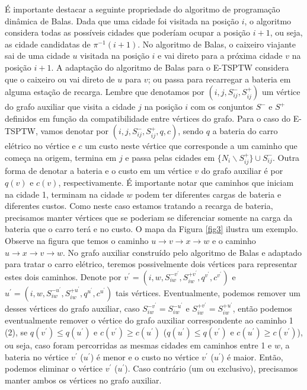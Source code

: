 \documentclass{article}
\begin{document}
É importante destacar a seguinte propriedade do algoritmo de programação dinâmica de Balas. Dada que uma cidade foi visitada na posição $i$, o algoritmo considera todas as possíveis cidades que poderíam ocupar a posição $i+1$, ou seja, as cidade candidatas de $\pi^{-1}(i+1)$. No algoritmo de Balas, o caixeiro viajante sai de uma cidade $u$ visitada na posição $i$ e vai direto para a próxima cidade $v$ na posição $i+1$. A adaptação do algoritmo de Balas para o E-TSPTW considera que o caixeiro ou vai direto de $u$ para $v$; ou passa para recarregar a bateria em alguma estação de recarga. Lembre que denotamos por $(i,j,S^-_{ij},S^+_{ij})$ um vértice do grafo auxiliar que visita a cidade $j$ na posição $i$ com os conjuntos $S^-$ e $S^+$ definidos em função da compatibilidade entre vértices do grafo. Para o caso do E-TSPTW, vamos denotar por $(i, j, S^-_{ij}, S^+_{ij}, q, c)$, sendo $q$ a bateria do carro elétrico no vértice e $c$ um custo neste vértice que corresponde a um caminho que começa na origem, termina em $j$ e passa pelas cidades em $\{N_{i} \backslash S^+_{ij}\} \cup S^-_{ij}$. Outra forma de denotar a bateria e o custo em um vértice $v$ do grafo auxiliar é por $q(v)$ e $c(v)$, respectivamente. É importante notar que caminhos que iniciam na cidade 1, terminam na cidade $w$ podem ter diferentes cargas de bateria e diferentes custos. Como neste caso estamos tratando a recarga de bateria, precisamos manter vértices que se poderiam se diferenciar somente na carga da bateria que o carro terá e no custo. O mapa da Figura \ref{fig3} ilustra um exemplo. Observe na figura que temos o caminho $u \rightarrow v \rightarrow x \rightarrow w$ e o caminho $u  \rightarrow x  \rightarrow v  \rightarrow w$. No grafo auxiliar construído pelo algoritmo de Balas e adaptado para tratar o carro elétrico, teremos possivelmente dois vértices para representar estes dois caminhos. Denote por $v^\prime=(i, w, S^{-v^\prime}_{iw}, S^{+v^\prime}_{iw}, q^{v^\prime}, c^{v^\prime})$ e $u^\prime=(i, w, S^{-u^\prime}_{iw}, S^{+u^\prime}_{iw}, q^{u^\prime}, c^{u^\prime})$ tais vértices. Eventualmente, podemos remover um desses vértices do grafo auxiliar, caso $S^{-v^\prime}_{iw} = S^{-u^\prime}_{iw}$ e $S^{+v^\prime}_{iw} = S^{+u^\prime}_{iw}$, então podemos eventualmente remover o vértice do grafo auxiliar correspondente ao caminho 1 (2), se $q(v^\prime) \leq q(u^\prime)$ e $c(v^\prime) \geq c(u^\prime)$ ($q(u^\prime) \leq q(v^\prime)$ e $c(u^\prime) \geq c(v^\prime)$), ou seja, caso foram percorridas as mesmas cidades em caminhos entre 1 e $w$, a bateria no vértice $v^\prime$ ($u^\prime$) é menor e o custo no vértice $v^\prime$ ($u^\prime$) é maior. Então, podemos eliminar o vértice $v^\prime$ ($u^\prime$). Caso contrário (um ou exclusivo), precisamos manter ambos os vértices no grafo auxiliar.
\end{document}
